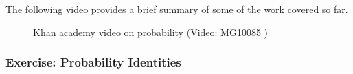 \label{m39377*eip-778}The following video provides a brief summary of some of the
work covered so far.

    \setcounter{subfigure}{0}


	\begin{figure}[H] %
    
    
    \textnormal{Khan academy video on
probability}\vspace{.1in} \nopagebreak
  \label{m39377*yt-media}\label{m39377*yt-video}
             { (Video:  MG10085 )}
      
      \vspace{2pt}
    \vspace{.1in}
    
    

 \end{figure}   

    \addtocounter{footnote}{-0}
    \par \label{m39377*secfhsst!!!underscore!!!id985}
            \subsubsection{ Exercise: Probability Identities
}
            \nopagebreak
            
